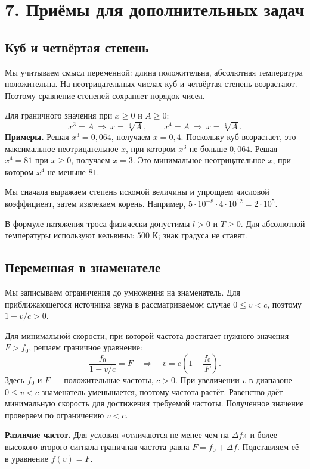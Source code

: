 \documentclass[a4paper,12pt]{article}
\newcommand{\heading}[1]{\section*{\color{darkaccent}#1}}
\newcommand{\subheading}[1]{\subsection*{\color{darkaccent}#1}}
\newcommand{\checkitem}[1]{\par\noindent\makebox[6mm][l]{$\square$}\begin{minipage}[t]{\dimexpr\linewidth-6mm\relax}\raggedright #1\end{minipage}\par}
\begin{document}
\heading{7. Приёмы для дополнительных задач}
\subheading{Куб и четвёртая степень}
\checkitem{Мы учитываем смысл переменной: длина положительна, абсолютная температура положительна. На неотрицательных числах куб и четвёртая степень возрастают. Поэтому сравнение степеней сохраняет порядок чисел.}
Для граничного значения при $x\ge0$ и $A\ge0$:
\[
x^3=A\ \Longrightarrow\ x=\sqrt[3]{A},\qquad
x^4=A\ \Longrightarrow\ x=\sqrt[4]{A}.
\]
\textbf{Примеры.} Решая $x^3=0,064$, получаем $x=0,4$. Поскольку куб возрастает, это максимальное неотрицательное $x$, при котором $x^3$ не больше $0,064$. Решая $x^4=81$ при $x\ge0$, получаем $x=3$. Это минимальное неотрицательное $x$, при котором $x^4$ не меньше $81$.

\checkitem{Мы сначала выражаем степень искомой величины и упрощаем числовой коэффициент, затем извлекаем корень. Например, $5\cdot10^{-8}\cdot4\cdot10^{12}=2\cdot10^5$.}
В формуле натяжения троса физически допустимы $l>0$ и $T\ge0$. Для абсолютной температуры используют кельвины: $500\text{ К}$; знак градуса не ставят.

\subheading{Переменная в знаменателе}
\checkitem{Мы записываем ограничения до умножения на знаменатель. Для приближающегося источника звука в рассматриваемом случае $0\le v<c$, поэтому $1-v/c>0$.}
Для минимальной скорости, при которой частота достигает нужного значения $F>f_0$, решаем граничное уравнение:
\[
\frac{f_0}{1-v/c}=F
\quad\Longrightarrow\quad
v=c\left(1-\frac{f_0}{F}\right).
\]
Здесь $f_0$ и $F$ --- положительные частоты, $c>0$. При увеличении $v$ в диапазоне $0\le v<c$ знаменатель уменьшается, поэтому частота растёт. Равенство даёт минимальную скорость для достижения требуемой частоты. Полученное значение проверяем по ограничению $v<c$.

\textbf{Различие частот.} Для условия «отличаются не менее чем на $\Delta f$» и более высокого второго сигнала граничная частота равна $F=f_0+\Delta f$. Подставляем её в уравнение $f(v)=F$.
\end{document}
